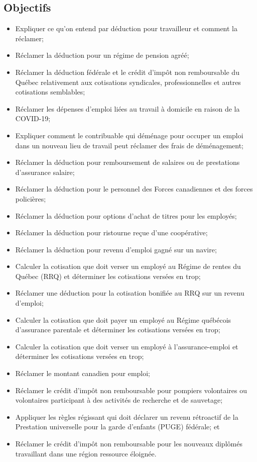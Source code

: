 \subsection{Objectifs}
\begin{itemize}
	\item Expliquer ce qu'on entend par déduction pour travailleur et comment la réclamer;
	\item Réclamer la déduction pour un régime de pension agréé;
	\item Réclamer la déduction fédérale et le crédit d'impôt non remboursable du Québec relativement aux cotisations syndicales, professionnelles et autres cotisations semblables;
	\item Réclamer les dépenses d'emploi liées au travail à domicile en raison de la COVID-19;
	\item Expliquer comment le contribuable qui déménage pour occuper un emploi dans un nouveau lieu de travail peut réclamer des frais de déménagement;
	\item Réclamer la déduction pour remboursement de salaires ou de prestations d'assurance salaire;
	\item Réclamer la déduction pour le personnel des Forces canadiennes et des forces policières;
	\item Réclamer la déduction pour options d'achat de titres pour les employés;
	\item Réclamer la déduction pour ristourne reçue d'une coopérative;
	\item Réclamer la déduction pour revenu d'emploi gagné sur un navire;
	\item Calculer la cotisation que doit verser un employé au Régime de rentes du Québec (RRQ) et déterminer les cotisations versées en trop;
	\item Réclamer une déduction pour la cotisation bonifiée au RRQ sur un revenu d'emploi; 
	\item Calculer la cotisation que doit payer un employé au Régime québécois d'assurance parentale et déterminer les cotisations versées en trop;
	\item Calculer la cotisation que doit verser un employé à l'assurance-emploi et déterminer les cotisations versées en trop;
	\item Réclamer le montant canadien pour emploi;
	\item Réclamer le crédit d'impôt non remboursable pour pompiers volontaires ou volontaires participant à des activités de recherche et de sauvetage;
	\item Appliquer les règles régissant qui doit déclarer un revenu rétroactif de la Prestation universelle pour la garde d'enfants (PUGE) fédérale; et
	\item Réclamer le crédit d'impôt non remboursable pour les nouveaux diplômés travaillant dans une région ressource éloignée.
\end{itemize}


